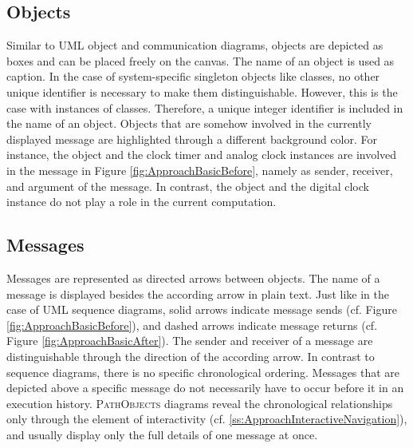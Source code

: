 \subsection{Objects}
\label{ss:ApproachNotationObjects}
Similar to UML object and communication diagrams, objects are depicted as boxes and can be placed freely on the canvas.
The name of an object is used as caption.
In the case of system-specific singleton objects like classes, no other unique identifier is necessary to make them distinguishable.
However, this is the case with instances of classes.
Therefore, a unique integer identifier is included in the name of an object.
Objects that are somehow involved in the currently displayed message are highlighted through a different background color.
For instance, the  object and the clock timer and analog clock instances are involved in the  message in Figure \ref{fig:ApproachBasicBefore}, namely as sender, receiver, and argument of the message.
In contrast, the  object and the digital clock instance do not play a role in the current computation.

\subsection{Messages}
\label{ss:ApproachNotationMessages}
Messages are represented as directed arrows between objects.
The name of a message is displayed besides the according arrow in plain text.
Just like in the case of UML sequence diagrams, solid arrows indicate message sends (cf. Figure \ref{fig:ApproachBasicBefore}), and dashed arrows indicate message returns (cf. Figure \ref{fig:ApproachBasicAfter}).
The sender and receiver of a message are distinguishable through the direction of the according arrow.
In contrast to sequence diagrams, there is no specific chronological ordering.
Messages that are depicted above a specific message do not necessarily have to occur before it in an execution history.
\textsc{PathObjects} diagrams reveal the chronological relationships only through the element of interactivity (cf. \ref{ss:ApproachInteractiveNavigation}), and usually display only the full details of one message at once.

